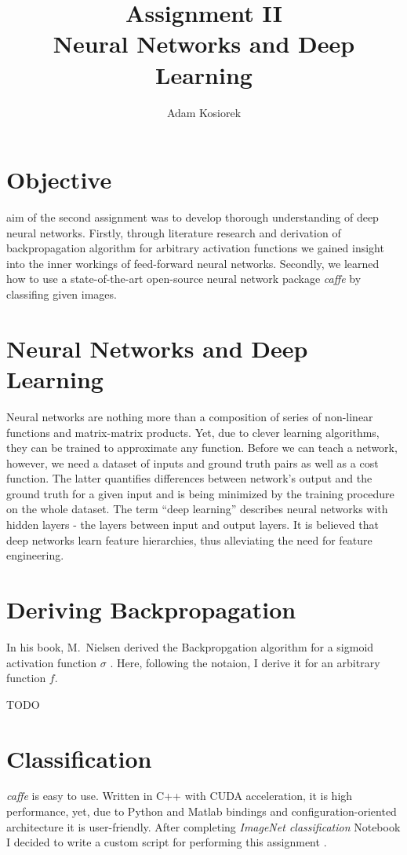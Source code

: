 \documentclass[journal, a4paper]{IEEEtran}
\begin{document}
	\title{Assignment II\\Neural Networks and Deep Learning}
	\author{Adam Kosiorek}	
	\maketitle
	
	
\section{Objective}
     aim of the second assignment was to develop thorough understanding of deep neural networks. Firstly, through literature research and derivation of backpropagation algorithm for arbitrary activation functions we gained insight into the inner workings of feed-forward neural networks. Secondly, we learned how to use a state-of-the-art open-source neural network package \textit{caffe} \cite{caffe} by classifing given images.

\section{Neural Networks and Deep Learning}
    Neural networks are nothing more than a composition of series of non-linear functions and matrix-matrix products. Yet, due to clever learning algorithms, they can be trained to approximate any function. Before we can teach a network, however, we need a dataset of inputs and ground truth pairs as well as a cost function. The latter quantifies differences between network's output and the ground truth for a given input and is being minimized by the training procedure on the whole dataset. The term ``deep learning'' describes neural networks with hidden layers - the layers between input and output layers. It is believed that deep networks learn feature hierarchies, thus alleviating the need for feature engineering.

\section{Deriving Backpropagation}
    In his book, M.~Nielsen derived the Backpropgation algorithm for a sigmoid activation function $\sigma$ \cite{MLDL}. Here, following the notaion, I derive it for an arbitrary function $f$.
    
    TODO
    
    		
\section {Classification}
  \textit{caffe} is easy to use. Written in C++ with CUDA acceleration, it is high performance, yet, due to Python and Matlab bindings and configuration-oriented architecture it is user-friendly. After completing \textit{ImageNet classification} Notebook I decided to write a custom script for performing this assignment \cite{code}.
  
\end{document}
